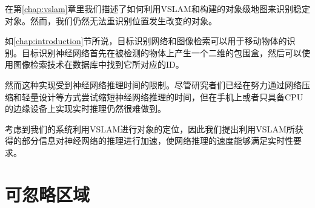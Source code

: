   
  
  


在第\ref{chap:vslam}章里我们描述了如何利用VSLAM和构建的对象级地图来识别稳定对象。然而，我们仍然无法重识别位置发生改变的对象。

如\ref{chap:introduction}节所说，目标识别网络和图像检索可以用于移动物体的识别。目标识别神经网络首先在被检测的物体上产生一个二维的包围盒，然后可以使用图像检索技术在数据库中找到它所对应的ID。

然而这种实现受到神经网络推理时间的限制。尽管研究者们已经在努力通过网络压缩和轻量设计等方式尝试缩短神经网络推理的时间，但在手机上或者只具备CPU的边缘设备上实现实时推理仍然很难做到。

考虑到我们的系统利用VSLAM进行对象的定位，因此我们提出利用VSLAM所获得的部分信息对神经网络的推理进行加速，使网络推理的速度能够满足实时性要求。

\section{可忽略区域}

